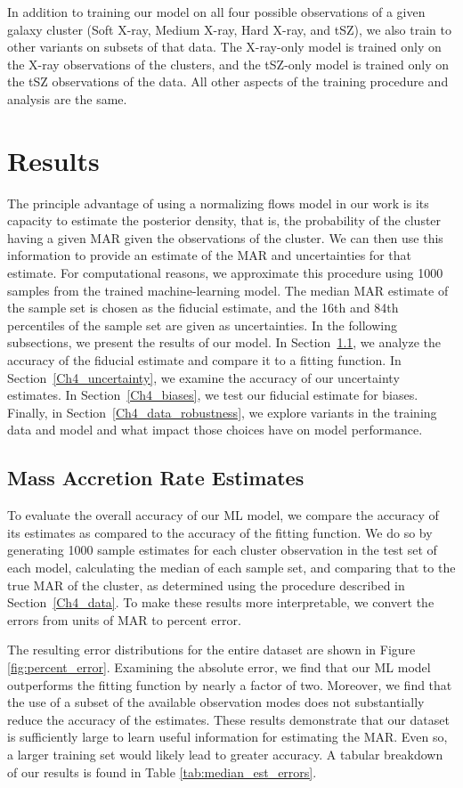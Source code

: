 In addition to training our model on all four possible observations of a given galaxy cluster (Soft X-ray, Medium X-ray, Hard X-ray, and tSZ), we also train to other variants on subsets of that data. The X-ray-only model is trained only on the X-ray observations of the clusters, and the tSZ-only model is trained only on the tSZ observations of the data. All other aspects of the training procedure and analysis are the same.

\section{Results}\label{Ch4_results}
The principle advantage of using a normalizing flows model in our work is its capacity to estimate the posterior density, that is, the probability of the cluster having a given MAR given the observations of the cluster. We can then use this information to provide an estimate of the MAR and uncertainties for that estimate. For computational reasons, we approximate this procedure using 1000 samples from the trained machine-learning model. The median MAR estimate of the sample set is chosen as the fiducial estimate, and the 16th and 84th percentiles of the sample set are given as uncertainties. In the following subsections, we present the results of our model. In Section~\ref{Ch4_accuracy}, we analyze the accuracy of the fiducial estimate and compare it to a fitting function. In Section~\ref{Ch4_uncertainty}, we examine the accuracy of our uncertainty estimates. In Section~\ref{Ch4_biases}, we test our fiducial estimate for biases. Finally, in Section~\ref{Ch4_data_robustness}, we explore variants in the training data and model and what impact those choices have on model performance.

\subsection{Mass Accretion Rate Estimates}\label{Ch4_accuracy}
To evaluate the overall accuracy of our ML model, we compare the accuracy of its estimates as compared to the accuracy of the fitting function. We do so by generating 1000 sample estimates for each cluster observation in the test set of each model, calculating the median of each sample set, and comparing that to the true MAR of the cluster, as determined using the procedure described in Section~\ref{Ch4_data}. To make these results more interpretable, we convert the errors from units of MAR to percent error.

The resulting error distributions for the entire dataset are shown in Figure \ref{fig:percent_error}. Examining the absolute error, we find that our ML model outperforms the fitting function by nearly a factor of two. Moreover, we find that the use of a subset of the available observation modes does not substantially reduce the accuracy of the estimates. These results demonstrate that our dataset is sufficiently large to learn useful information for estimating the MAR. Even so, a larger training set would likely lead to greater accuracy. A tabular breakdown of our results is found in Table \ref{tab:median_est_errors}.

